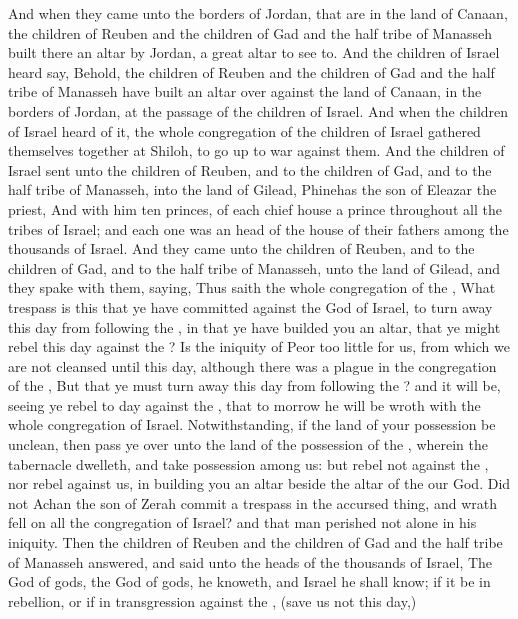 \begin{biblechapter}
\verse And when they came unto the borders of Jordan, that are in the land of Canaan, the children of Reuben and the children of Gad and the half tribe of Manasseh built there an altar by Jordan, a great altar to see to.
\verse And the children of Israel heard say, Behold, the children of Reuben and the children of Gad and the half tribe of Manasseh have built an altar over against the land of Canaan, in the borders of Jordan, at the passage of the children of Israel.
\verse And when the children of Israel heard of it, the whole congregation of the children of Israel gathered themselves together at Shiloh, to go up to war against them.
\verse And the children of Israel sent unto the children of Reuben, and to the children of Gad, and to the half tribe of Manasseh, into the land of Gilead, Phinehas the son of Eleazar the priest,
\verse And with him ten princes, of each chief house a prince throughout all the tribes of Israel; and each one was an head of the house of their fathers among the thousands of Israel.
\verse And they came unto the children of Reuben, and to the children of Gad, and to the half tribe of Manasseh, unto the land of Gilead, and they spake with them, saying,
\verse Thus saith the whole congregation of the \LORD, What trespass is this that ye have committed against the God of Israel, to turn away this day from following the \LORD, in that ye have builded you an altar, that ye might rebel this day against the \LORD?
\verse Is the iniquity of Peor too little for us, from which we are not cleansed until this day, although there was a plague in the congregation of the \LORD,
\verse But that ye must turn away this day from following the \LORD? and it will be, seeing ye rebel to day against the \LORD, that to morrow he will be wroth with the whole congregation of Israel.
\verse Notwithstanding, if the land of your possession be unclean, then pass ye over unto the land of the possession of the \LORD, wherein the \LORDs tabernacle dwelleth, and take possession among us: but rebel not against the \LORD, nor rebel against us, in building you an altar beside the altar of the \LORD our God.
\verse Did not Achan the son of Zerah commit a trespass in the accursed thing, and wrath fell on all the congregation of Israel? and that man perished not alone in his iniquity.
\verse Then the children of Reuben and the children of Gad and the half tribe of Manasseh answered, and said unto the heads of the thousands of Israel,
\verse The \LORD God of gods, the \LORD God of gods, he knoweth, and Israel he shall know; if it be in rebellion, or if in transgression against the \LORD, (save us not this day,)

\end{biblechapter}
